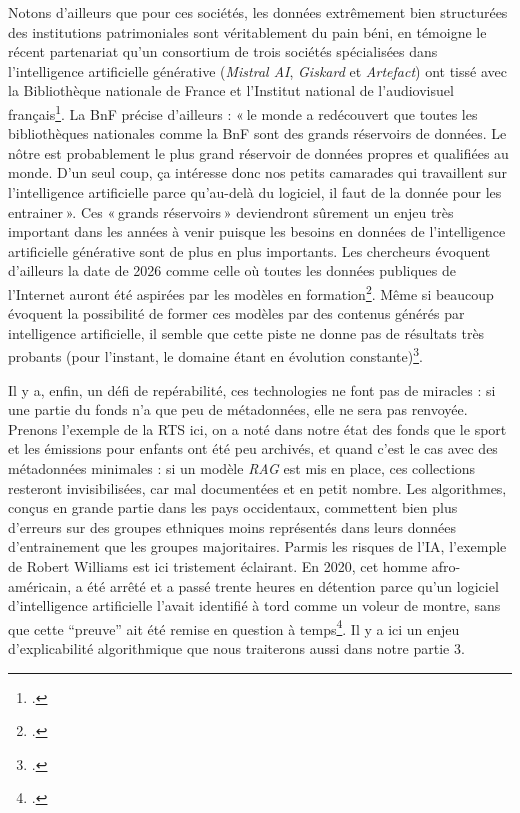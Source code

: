 Notons d’ailleurs que pour ces sociétés, les données extrêmement bien structurées des institutions patrimoniales sont véritablement du pain béni, en témoigne le récent partenariat qu’un consortium de trois sociétés spécialisées dans l’intelligence artificielle générative (\textit{Mistral AI}, \textit{Giskard} et \textit{Artefact}) ont tissé avec la Bibliothèque nationale de France et l’Institut national de l’audiovisuel français\footcite{clavey_bnf_2024}. La BnF précise d’ailleurs : « le monde a redécouvert que toutes les bibliothèques nationales comme la BnF sont des grands réservoirs de données. Le nôtre est probablement le plus grand réservoir de données propres et qualifiées au monde. D’un seul coup, ça intéresse donc nos petits camarades qui travaillent sur l’intelligence artificielle parce qu’au-delà du logiciel, il faut de la donnée pour les entrainer ». Ces « grands réservoirs » deviendront sûrement un enjeu très important dans les années à venir puisque les besoins en données de l’intelligence artificielle générative sont de plus en plus importants. Les chercheurs évoquent d’ailleurs la date de 2026 comme celle où toutes les données publiques de l’Internet auront été aspirées par les modèles en formation\footcite{forbes_internet_2024}. Même si beaucoup évoquent la possibilité de former ces modèles par des contenus générés par intelligence artificielle, il semble que cette piste ne donne pas de résultats très probants (pour l’instant, le domaine étant en évolution constante)\footcite{noauthor_entrainer_nodate}.

Il y a, enfin, un défi de repérabilité, ces technologies ne font pas de miracles : si une partie du fonds n’a que peu de métadonnées, elle ne sera pas renvoyée. Prenons l’exemple de la RTS ici, on a noté dans notre état des fonds que le sport et les émissions pour enfants ont été peu archivés, et quand c’est le cas avec des métadonnées minimales : si un modèle \textit{RAG} est mis en place, ces collections resteront invisibilisées, car mal documentées et en petit nombre. Les algorithmes, conçus en grande partie dans les pays occidentaux, commettent bien plus d’erreurs sur des groupes ethniques moins représentés dans leurs données d’entrainement que les groupes majoritaires. Parmis les risques de l'IA, l’exemple de Robert Williams est ici tristement éclairant. En 2020, cet homme afro-américain, a été arrêté et a passé trente heures en détention parce qu’un logiciel d’intelligence artificielle l'avait identifié à tord comme un voleur de montre, sans que cette \enquote{preuve} ait été remise en question à temps\footcite{noauthor_etats-unis_nodate}. Il y a ici un enjeu d’explicabilité algorithmique que nous traiterons aussi dans notre partie 3.

